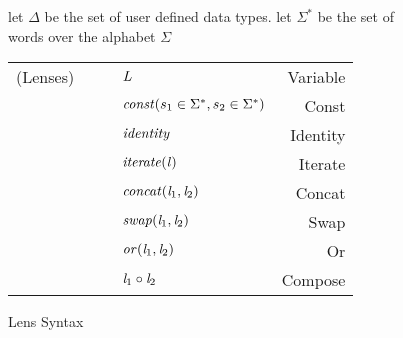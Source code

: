 

\begin{figure}

let $\Delta$ be the set of user defined data types.
let $\Sigma^*$ be the set of words over the alphabet $\Sigma$\\

\begin{tabular}{l@{\ }l@{\ }c@{\ }l@{\ }r}

(Lenses)& \Lens{} & \GEq{} & $\mathit{L}$ & Variable\\
& & & \GBar{} $\mathit{const}(s_1 \in \Sigma^*,s_2 \in \Sigma^*)$ & Const \\
& & & \GBar{} $\mathit{identity}$ & Identity\\
& & & \GBar{} $\mathit{iterate(\mathit{l})}$ & Iterate \\
& & & \GBar{} $\mathit{concat}(\mathit{l}_1,\mathit{l}_2)$ & Concat \\
& & & \GBar{} $\mathit{swap}(\mathit{l}_1,\mathit{l}_2)$ & Swap\\
& & & \GBar{} $\mathit{or}(\mathit{l}_1,\mathit{l}_2)$ & Or\\
& & & \GBar{} $\mathit{l}_1 \circ \mathit{l}_2$ & Compose\\
\end{tabular}
\caption{Lens Syntax}
\label{fig:lens-syntax}
\end{figure}
